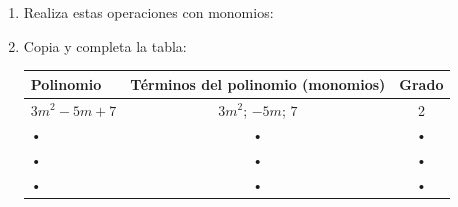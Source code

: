 \documentclass[10pt,twoside]{article}
\begin{document}
\begin{enumerate}
\begin{enumerate}
\end{enumerate}
\item Realiza estas operaciones con monomios:
\begin{enumerate}
\end{enumerate}
\item Copia y completa la tabla:
\begin{center}
\begin{tabular}{|l|c|c|}
\hline 
\hspace*{.5cm} Polinomio & Términos del polinomio (monomios) & Grado \\ 
\hline 
$3m^{2}-5m+7$ & $3m^{2}$; \quad $-5m$; \quad $7$ & 2 \\ 
\hline 
• & • & • \\ 
\hline 
• & • & • \\ 
\hline 
• & • & • \\ 
\hline 
\end{tabular} 
\end{center}
\end{enumerate}
\end{document}
